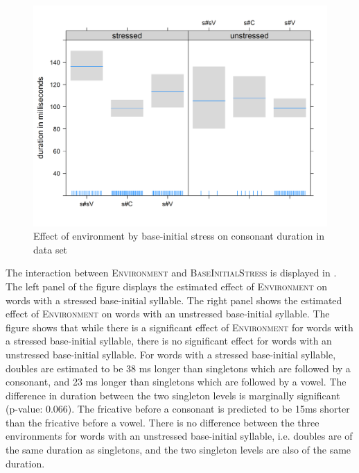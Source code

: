 \begin{figure}

	
	\includegraphics [scale=0.5]{images/Corpus/disModelTransitionTypeByStress.png}
	\caption{Effect of environment by base-initial stress on consonant duration in data set}
	\label{fig:corpus main effect 1 dis}
\end{figure}

The interaction between \textsc{Environment} and \textsc{BaseInitialStress} is displayed in . The left panel of the figure displays the estimated effect of \textsc{Environment} on words with a stressed base-initial syllable. The right panel shows the estimated effect of \textsc{Environment} on words with an unstressed base-initial syllable. The figure shows that while there is a significant effect of \textsc{Environment} for words with a stressed base-initial syllable, there is no significant effect for words with an unstressed base-initial syllable. For words with a stressed base-initial syllable, doubles are estimated to be 38 ms  longer than singletons which are followed by a consonant, and 23 ms longer than singletons which are followed by a vowel. 
The difference in duration between the two singleton levels is marginally significant (p-value: $0.066$). The fricative before a consonant is predicted to be 15ms shorter than the fricative before a vowel.  There is no difference between the three environments for words with an unstressed base-initial syllable, i.e. doubles are of the same duration as singletons, and the two singleton levels are  also of the same duration. 


